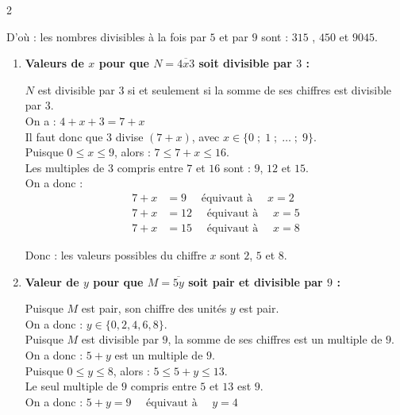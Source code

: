 \documentclass[10pt, a4paper]{article}
\begin{document}
\begin{multicols*}{2}
\begin{Solution}[APPLICATION][5]
\begin{enumerate}[leftmargin=*,itemsep=0.5pt]
   D'où : \quad les nombres divisibles à la fois par $5$ et par $9$ sont : $315$ , $450$ et $9045$.
\end{enumerate}
\end{Solution}

\begin{Solution}[APPLICATION][6]
\begin{enumerate}[leftmargin=*,itemsep=0.5pt]
    \item \textbf{Valeurs de $x$ pour que $N = \overline{4x3}$ soit divisible par $3$ :}

    $N$ est divisible par $3$ si et seulement si la somme de ses chiffres est divisible par $3$. \\
    On a : $4 + x + 3 = 7 + x$ \\
    Il faut donc que $3$ divise $(7 + x)$, avec $x \in \big\{0 \; ; \; 1 \; ; \; \ldots \; ; \; 9\big\}$. \\
    Puisque $0 \leq x \leq 9$, alors : $7 \leq 7 + x \leq 16$. \\
    Les multiples de $3$ compris entre $7$ et $16$ sont : $9$, $12$ et $15$. \\
    On a donc :
    \begin{align*}
        7 + x &= 9 \quad \text{ équivaut à } \quad x = 2 \\
        7 + x &= 12 \quad \text{ équivaut à } \quad x = 5 \\
        7 + x &= 15 \quad \text{ équivaut à } \quad x = 8
    \end{align*}

    Donc : \quad les valeurs possibles du chiffre $x$ sont $2$, $5$ et $8$.

    \item \textbf{Valeur de $y$ pour que $M = \overline{5y}$ soit pair et divisible par $9$ :}

    Puisque $M$ est pair, son chiffre des unités $y$ est pair. \\
    On a donc : $y \in \big\{0, 2, 4, 6, 8\big\}$. \\
    Puisque $M$ est divisible par $9$, la somme de ses chiffres est un multiple de $9$. \\
    On a donc : $5 + y$ est un multiple de $9$. \\
    Puisque $0 \leq y \leq 8$, alors : $5 \leq 5 + y \leq 13$. \\
    Le seul multiple de $9$ compris entre $5$ et $13$ est $9$. \\
    On a donc : \quad
        $5 + y = 9 \quad \text{ équivaut à } \quad y = 4$


\end{enumerate}
\end{Solution}
\end{multicols*}
\end{document}
